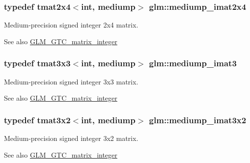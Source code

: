 \subsubsection[{mediump\+\_\+imat2x4}]{\setlength{\rightskip}{0pt plus 5cm}typedef tmat2x4$<$int, mediump$>$ {\bf glm\+::mediump\+\_\+imat2x4}}\label{group__gtc__matrix__integer_ga944a139f15de6bc12e9c7bf615ffc4f5}
Medium-\/precision signed integer 2x4 matrix. \begin{DoxySeeAlso}{See also}
\hyperlink{group__gtc__matrix__integer}{G\+L\+M\+\_\+\+G\+T\+C\+\_\+matrix\+\_\+integer} 
\end{DoxySeeAlso}
\hypertarget{group__gtc__matrix__integer_gab033bd6a2bfebb1aa35d458c6f077ccb}{}
\subsubsection[{mediump\+\_\+imat3}]{\setlength{\rightskip}{0pt plus 5cm}typedef tmat3x3$<$int, mediump$>$ {\bf glm\+::mediump\+\_\+imat3}}\label{group__gtc__matrix__integer_gab033bd6a2bfebb1aa35d458c6f077ccb}
Medium-\/precision signed integer 3x3 matrix. \begin{DoxySeeAlso}{See also}
\hyperlink{group__gtc__matrix__integer}{G\+L\+M\+\_\+\+G\+T\+C\+\_\+matrix\+\_\+integer} 
\end{DoxySeeAlso}
\hypertarget{group__gtc__matrix__integer_ga8f682b5b64e2072c0729409ee6bfe2af}{}
\subsubsection[{mediump\+\_\+imat3x2}]{\setlength{\rightskip}{0pt plus 5cm}typedef tmat3x2$<$int, mediump$>$ {\bf glm\+::mediump\+\_\+imat3x2}}\label{group__gtc__matrix__integer_ga8f682b5b64e2072c0729409ee6bfe2af}
Medium-\/precision signed integer 3x2 matrix. \begin{DoxySeeAlso}{See also}
\hyperlink{group__gtc__matrix__integer}{G\+L\+M\+\_\+\+G\+T\+C\+\_\+matrix\+\_\+integer} 
\end{DoxySeeAlso}
\hypertarget{group__gtc__matrix__integer_gab4c647321a342c58119144ad08c6c406}{}
